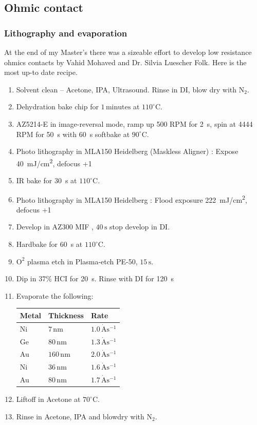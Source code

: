 \subsection{Ohmic contact}

\subsubsection{Lithography and evaporation}


At the end of my Master's there was a sizeable effort to develop low resistance ohmics contacts by Vahid Mohaved and Dr. Silvia Luescher Folk. Here is the most up-to date recipe. 


\begin{enumerate}
\item Solvent clean – Acetone, IPA, Ultrasound. Rinse in DI, blow dry with $\mathrm{N_2}$.
\item Dehydration bake chip for $1 \,\mathrm{minutes}$ at $110^\circ$C.
\item AZ5214-E  in image-reversal mode, ramp up 500 RPM  for \qty{2}{s}, spin at 4444 RPM for \qty{50}{s} with \qty{60}{s} softbake at $90^\circ$C.
\item Photo lithography in MLA150 Heidelberg (Maskless Aligner) : Expose \qty{40}{mJ/cm^2}, defocus +1 
\item IR bake for \qty{30}{s} at $110^\circ$C.
\item Photo lithography in MLA150 Heidelberg : Flood exposure \qty{222}{mJ/cm^2}, defocus +1 
\item Develop in AZ300 MIF , $40\,\mathrm{s}$ stop develop in DI.
\item Hardbake for \qty{60}{s} at $110^\circ$C.
\item $\mathrm{O^2}$ plasma etch in Plasma-etch PE-50, $15\,\mathrm{s}$.
\item Dip in $37\%$ HCI for \qty{20}{s}. Rinse with DI for \qty{120}{s}

\item Evaporate the following:

\begin{table}[H]     
\centering
  \begin{tabular}{|p{2.0cm}|p{2.0cm}|p{2.0cm}|}
    \hline
    Metal & Thickness & Rate\\
    \hline
    Ni & $7\,\mathrm{nm}$ & $1.0\,\mathrm{\dot{A}s^{-1}}$\\
    Ge & $80\,\mathrm{nm}$ & $1.3\,\mathrm{\dot{A}s^{-1}}$\\
    Au & $160\,\mathrm{nm}$ & $2.0\,\mathrm{\dot{A}s^{-1}}$\\
    Ni & $36\,\mathrm{nm}$ & $1.6\,\mathrm{\dot{A}s^{-1}}$\\
    Au & $80\,\mathrm{nm}$ & $1.7\,\mathrm{\dot{A}s^{-1}}$\\
    \hline
  \end{tabular}
\label{tab:ohmic_evaporation}
\end{table}
\item Liftoff in Acetone at $70^\circ$C.
\item Rinse in Acetone, IPA and blowdry with $\mathrm{N_2}$.
\end{enumerate}



